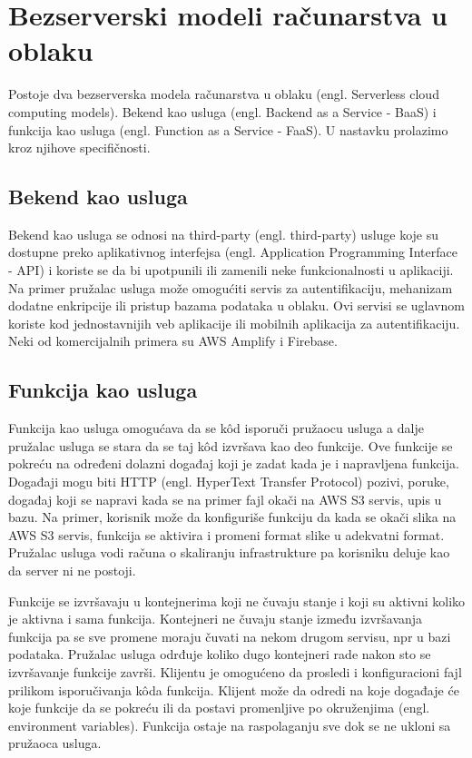 \documentclass[12pt,oneside]{memoir}
\begin{document}
\section{Bezserverski modeli računarstva u oblaku}
Postoje dva bezserverska modela računarstva u oblaku (engl. Serverless cloud computing models). Bekend kao usluga (engl. Backend as a Service - BaaS) i funkcija kao usluga (engl. Function as a Service - FaaS). U nastavku prolazimo kroz njihove specifičnosti.

\subsection{Bekend kao usluga}

Bekend kao usluga se odnosi na third-party (engl. third-party) usluge koje su dostupne preko aplikativnog interfejsa (engl. Application Programming Interface - API) i koriste se da bi upotpunili ili zamenili neke funkcionalnosti u aplikaciji. Na primer pružalac usluga može omogućiti servis za autentifikaciju, mehanizam dodatne enkripcije ili pristup bazama podataka u oblaku. Ovi servisi se uglavnom koriste kod jednostavnijih veb aplikacije ili mobilnih aplikacija za autentifikaciju\cite{wis}\cite{bsa}. Neki od komercijalnih primera su AWS Amplify i Firebase\cite{baasp}.

\subsection{Funkcija kao usluga}
Funkcija kao usluga omogućava da se kôd isporuči pružaocu usluga a dalje pružalac usluga se stara da se taj kôd izvršava kao deo funkcije. Ove funkcije se pokreću na određeni dolazni događaj koji je zadat kada je i napravljena funkcija. Događaji mogu biti HTTP (engl. HyperText Transfer Protocol) pozivi, poruke, događaj koji se napravi kada se na primer fajl okači na AWS S3 servis, upis u bazu. Na primer, korisnik može da konfiguriše funkciju da kada se okači slika na AWS S3 servis, funkcija se aktivira i promeni format slike u adekvatni format. Pružalac usluga vodi računa o skaliranju infrastrukture pa korisniku deluje kao da server ni ne postoji. 

Funkcije se izvršavaju u kontejnerima koji ne čuvaju stanje i koji su aktivni koliko je aktivna i sama funkcija. Kontejneri ne čuvaju stanje između izvršavanja funkcija pa se sve promene moraju čuvati na nekom drugom servisu, npr u bazi podataka. Pružalac usluga odrđuje koliko dugo kontejneri rade nakon sto se izvršavanje funkcije završi. Klijentu je omogućeno da prosledi i konfiguracioni fajl prilikom isporučivanja kôda funkcija. Klijent može da odredi na koje događaje će koje funkcije da se pokreću ili da postavi promenljive po okruženjima (engl. environment variables). Funkcija ostaje na raspolaganju sve dok se ne ukloni sa pružaoca usluga\cite{bsa}.
\end{document}
